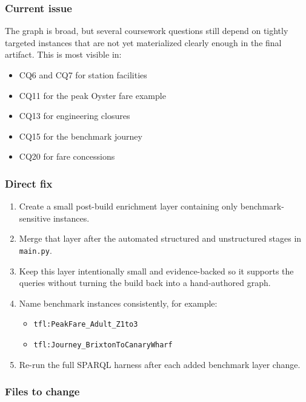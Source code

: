 \documentclass[
  11pt,
  a4paper,
]{article}
\providecommand{\tightlist}{%
  \setlength{\itemsep}{0pt}\setlength{\parskip}{0pt}}
\begin{document}
\subsubsection{Current issue}\label{current-issue-1}

The graph is broad, but several coursework questions still depend on
tightly targeted instances that are not yet materialized clearly enough
in the final artifact. This is most visible in:

\begin{itemize}
\tightlist
\item
  CQ6 and CQ7 for station facilities
\item
  CQ11 for the peak Oyster fare example
\item
  CQ13 for engineering closures
\item
  CQ15 for the benchmark journey
\item
  CQ20 for fare concessions
\end{itemize}

\subsubsection{Direct fix}\label{direct-fix-1}

\begin{enumerate}
\def\labelenumi{\arabic{enumi}.}
\tightlist
\item
  Create a small post-build enrichment layer containing only
  benchmark-sensitive instances.
\item
  Merge that layer after the automated structured and unstructured
  stages in \texttt{main.py}.
\item
  Keep this layer intentionally small and evidence-backed so it supports
  the queries without turning the build back into a hand-authored graph.
\item
  Name benchmark instances consistently, for example:

  \begin{itemize}
  \tightlist
  \item
    \texttt{tfl:PeakFare\_Adult\_Z1to3}
  \item
    \texttt{tfl:Journey\_BrixtonToCanaryWharf}
  \end{itemize}
\item
  Re-run the full SPARQL harness after each added benchmark layer
  change.
\end{enumerate}

\subsubsection{Files to change}\label{files-to-change-1}
\end{document}
